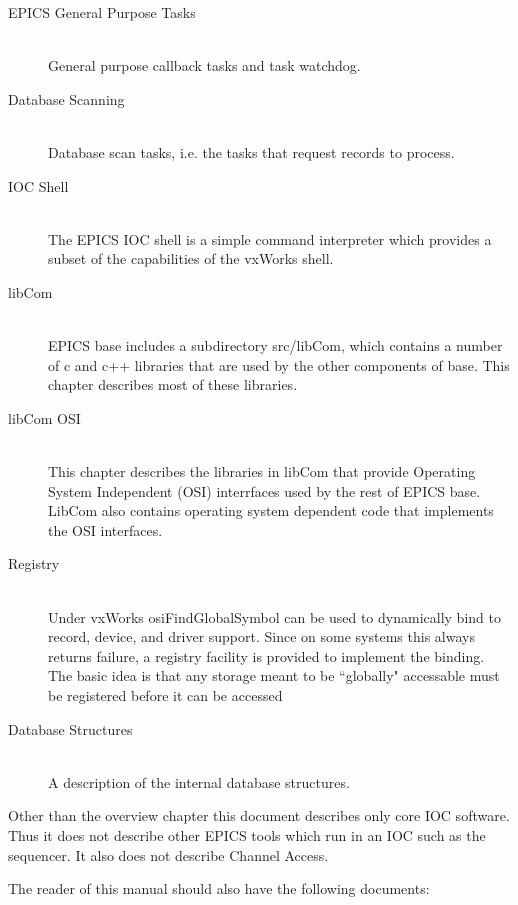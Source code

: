 \begin{description}
\item[EPICS General Purpose Tasks] \hfill \\
General purpose callback tasks and  task watchdog.

\item[Database Scanning] \hfill \\
Database scan tasks, i.e. the tasks that request records to process.

\item[IOC Shell] \hfill \\
The EPICS IOC shell is a simple command interpreter which provides a subset of the capabilities of the vxWorks 
shell.

\item[libCom] \hfill \\
EPICS base includes a subdirectory src/libCom, which contains a number of c and c++ libraries that are used by 
the other components of base. This chapter describes most of these libraries.

\item[libCom OSI] \hfill \\
This chapter describes the libraries in libCom that provide Operating System Independent (OSI) interrfaces used 
by the rest of EPICS base. LibCom also contains operating system dependent code that implements the OSI 
interfaces.

\item[Registry] \hfill \\
Under vxWorks osiFindGlobalSymbol can be used to dynamically bind to record, device, and driver support. Since 
on some systems this always returns failure, a registry facility is provided to implement the binding. The basic idea 
is that any storage meant to be ``globally" accessable must be registered before it can be accessed 

\item[Database Structures] \hfill \\
A description of the internal database structures.

\end{description}

Other than the overview chapter this document describes only core IOC software. Thus it does not describe other EPICS 
tools which run in an IOC such as the sequencer. It also does not describe Channel Access. 

The reader of this manual should also have the following documents:


